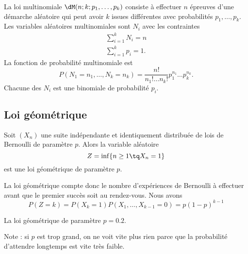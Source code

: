 La loi multinomiale \( \dM(n;k;p_1,\ldots, p_k)\) consiste à effectuer \( n\) épreuves d'une démarche aléatoire qui peut avoir \( k\) issues différentes avec probabilités \( p_1,\ldots, p_k\). Les variables aléatoires multinomiales sont \( N_i\) avec les contraintes
\begin{subequations}
	\begin{align}
		\sum_{i=1}^kN_i=n \\
		\sum_{i=1}^kp_i=1.
	\end{align}
\end{subequations}
La fonction de probabilité multinomiale est
\begin{equation}
	P(N_1=n_1,\ldots, N_k=n_k)=\frac{ n! }{ n_1!\ldots n_k! }p_1^{n_1}\ldots p_k^{n_k}.
\end{equation}
Chacune des \( N_i\) est une binomiale de probabilité \( p_i\).

\subsection{Loi géométrique}

Soit \( (X_n)\) une suite indépendante et identiquement distribuée de lois de Bernoulli de paramètre \( p\). Alors la variable aléatoire
\begin{equation}
	Z=\inf\{ n\geq 1\tq X_n=1 \}
\end{equation}
est une loi géométrique de paramètre \( p\).

La loi géométrique compte donc le nombre d'expériences de Bernoulli à effectuer avant que le premier succès soit au rendez-vous. Nous avons
\begin{equation}
	P(Z=k)=P(X_k=1)P(X_1,\ldots,X_{k-1}=0)=p(1-p)^{k-1}
\end{equation}

La loi géométrique de paramètre \( p=0.2\).

\begin{center}
	
\end{center}
Note : si \( p\) est trop grand, on ne voit vite plus rien parce que la probabilité d'attendre longtemps est vite très faible.

